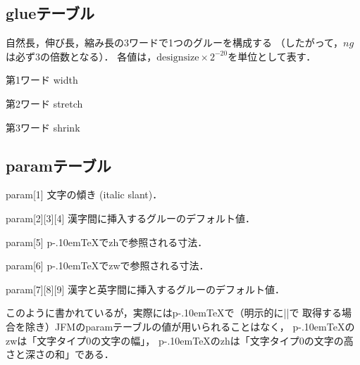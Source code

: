 \documentclass[a4paper,11pt,nomag]{jsarticle}
\def\pTeX{p\kern-.10em\TeX}\def\upTeX{u\pTeX}
\begin{document}
\subsection{glueテーブル}
自然長，伸び長，縮み長の3ワードで1つのグルーを構成する
（したがって，$ng$は必ず3の倍数となる）．
各値は，$\mathrm{design size}\times2^{-20}$を単位として表す．
\begin{description}
\item{第1ワード} width
\item{第2ワード} stretch
\item{第3ワード} shrink
\end{description}
%
\subsection{paramテーブル}
\begin{description}
\item{param[1]} 文字の傾き (italic slant)．
\item{param[2][3][4]} 漢字間に挿入するグルーのデフォルト値．
\item{param[5]} \pTeX{}でzhで参照される寸法．
\item{param[6]} \pTeX{}でzwで参照される寸法．
\item{param[7][8][9]} 漢字と英字間に挿入するグルーのデフォルト値．
\end{description}
\begin{dangerous}
このように書かれているが，実際には\pTeX で（明示的に|\fontdimen|で
取得する場合を除き）JFMのparamテーブルの値が用いられることはなく，
\pTeX のzwは「文字タイプ0の文字の幅」，
\pTeX のzhは「文字タイプ0の文字の高さと深さの和」である．
\end{dangerous}
%
\newpage
\DeleteShortVerb{|}
\end{document}
